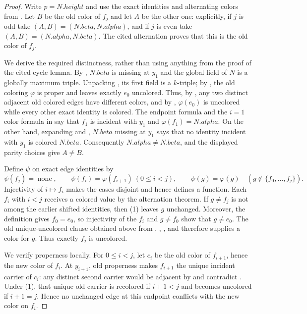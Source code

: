 \begin{proof}
Write $p=N.height$ and use the exact identities and alternating colors
from .  Let $B$ be the old color of
$f_j$ and let $A$ be the other one: explicitly, if $j$ is odd take
$(A,B)=(N.beta,N.alpha)$, and if $j$ is even take
$(A,B)=(N.alpha,N.beta)$.  The cited alternation proves that this is the
old color of $f_j$.

We derive the required distinctness, rather than using anything from the
proof of the cited cycle lemma.  By ,
$N.beta$ is missing at $y_1$ and the global field of $N$ is a globally
maximum triple.  Unpacking , its first field is
a $k$-triple; by , the old coloring $\varphi$ is proper and
leaves exactly $e_0$ uncolored.  Thus, by
, any two distinct adjacent old colored edges
have different colors, and by , $\varphi(e_0)$
is uncolored while every other exact identity is colored.  The endpoint
formula and the $i=1$ color formula in
 say that $f_1$ is incident with $y_1$
and $\varphi(f_1)=N.alpha$.  On the other hand, expanding
 and , $N.beta$ missing at
$y_1$ says that no identity incident with $y_1$ is colored $N.beta$.
Consequently $N.alpha\ne N.beta$, and the displayed parity choices give
$A\ne B$.

Define $\psi$ on exact edge identities by
\[
 \psi(f_j)=\operatorname{none},\qquad
 \psi(f_i)=\varphi(f_{i+1})\ (0\leq i<j),\qquad
 \psi(g)=\varphi(g)\quad
   (g\notin\{f_0,\ldots,f_j\}).                         \tag{1}
\]
Injectivity of $i\mapsto f_i$ makes the cases disjoint and hence defines a
function.  Each $f_i$ with $i<j$ receives a colored value by the
alternation theorem.  If $g\ne f_j$ is not among the earlier shifted
identities, then (1) leaves $g$ unchanged.  Moreover, the definition
 gives $f_0=e_0$, so injectivity of the $f_i$ and
$g\ne f_0$ show that $g\ne e_0$.  The old unique-uncolored clause obtained
above from ,
, , and
 therefore supplies a color for $g$.  Thus
exactly $f_j$ is uncolored.

We verify properness locally.  For $0\leq i<j$, let $c_i$ be the old
color of $f_{i+1}$, hence the new color of $f_i$.  At $y_{i+1}$, old
properness makes $f_{i+1}$ the unique incident carrier of $c_i$: any
distinct second carrier would be adjacent by  and
contradict .  Under (1), that unique old
carrier is recolored if $i+1<j$ and becomes uncolored if $i+1=j$.  Hence
no unchanged edge at this endpoint conflicts with the new color on
$f_i$.


\end{proof}

